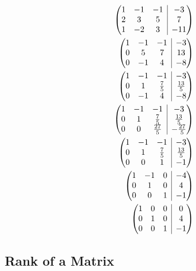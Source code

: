 \documentclass{article}
\makeatletter
\newenvironment{amatrix}[1]{%
  \left(\begin{array}{@{}*{#1}{c}|c@{}}
    }{%
  \end{array}\right)
}
\makeatother
\begin{document}
\begin{align*}
  \begin{amatrix}{3}
    1 & -1 & -1 & -3 \\
    2 & 3 & 5 & 7 \\
    1 & -2 & 3 & -11
  \end{amatrix}                   \\
  \begin{amatrix}{3}
    1 & -1 & -1 & -3 \\
    0 & 5 & 7 & 13 \\
    0 & -1 & 4 & -8
  \end{amatrix}                   \\
  \begin{amatrix}{3}
    1 & -1 & -1 & -3 \\
    0 & 1 & \frac{7}{5} & \frac{13}{5} \\
    0 & -1 & 4 & -8
  \end{amatrix}  \\
  \begin{amatrix}{3}
    1 & -1 & -1 & -3 \\
    0 & 1 & \frac{7}{5} & \frac{13}{5} \\
    0 & 0 & \frac{27}{5} & -\frac{27}{5}
  \end{amatrix} \\
  \begin{amatrix}{3}
    1 & -1 & -1 & -3 \\
    0 & 1 & \frac{7}{5} & \frac{13}{5} \\
    0 & 0 & 1 & -1
  \end{amatrix}  \\
  \begin{amatrix}{3}
    1 & -1 & 0 & -4 \\
    0 & 1 & 0 & 4 \\
    0 & 0 & 1 & -1
  \end{amatrix}                   \\
  \begin{amatrix}{3}
    1 & 0 & 0 & 0 \\
    0 & 1 & 0 & 4 \\
    0 & 0 & 1 & -1
  \end{amatrix}                   \\
\end{align*}

\subsection{Rank of a Matrix}
\end{document}
